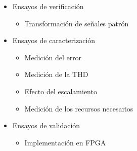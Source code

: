 \begin{frame}{}
  \begin{itemize}
    \item<1-> Ensayos de verificación
    \begin{itemize}
      \Fontitit
      \item<1-> Transformación de señales patrón
    \end{itemize}
    \item<1-> Ensayos de caracterización
    \begin{itemize}
      \Fontitit
      \item<1-> Medición del error
      \item<1-> Medición de la THD
      \item<1-> Efecto del escalamiento
      \item<1-> Medición de los recursos necesarios 
    \end{itemize}
    \item<1-> Ensayos de validación
    \begin{itemize}
      \Fontitit
      \item<1-> Implementación en FPGA
    \end{itemize}
  \end{itemize}
\end{frame}

